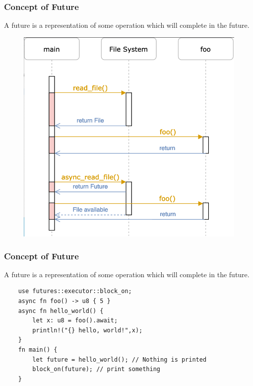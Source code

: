 \begin{frame}[fragile]
    \frametitle{Concept of Future}

% 
% 
A future is a representation of some operation which will complete in the future.
% 
    \begin{figure}
    \includegraphics[width=0.45\linewidth]{figs/async-example.png}
    \end{figure}

% 

\end{frame}


\begin{frame}[fragile]
    \frametitle{Concept of Future}
    
    A future is a representation of some operation which will complete in the future.
    \begin{block}{}
		\begin{verbatim}
    use futures::executor::block_on;
    async fn foo() -> u8 { 5 }  
    async fn hello_world() {
        let x: u8 = foo().await;
        println!("{} hello, world!",x);
    }
    fn main() {
        let future = hello_world(); // Nothing is printed
        block_on(future); // print something
    }
\end{verbatim}
\end{block}
    
    
\end{frame}

